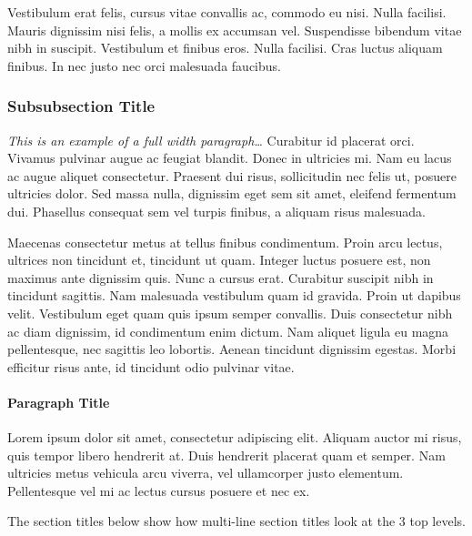 \documentclass[
	a4paper, %
	12pt, %
]{include/CSSullivanBusinessReport}
\begin{document}
\nonumsidenote{
	}Vestibulum erat felis, cursus vitae convallis ac, commodo eu nisi. Nulla facilisi. Mauris dignissim nisi felis, a mollis ex accumsan vel. Suspendisse bibendum vitae nibh in suscipit. Vestibulum et finibus eros. Nulla facilisi. Cras luctus aliquam finibus. In nec justo nec orci malesuada faucibus.

\subsubsection{Subsubsection Title} %

\begin{fullwidth} %
	\textit{This is an example of a full width paragraph\ldots} Curabitur id placerat orci. Vivamus pulvinar augue ac feugiat blandit. Donec in ultricies mi. Nam eu lacus ac augue aliquet consectetur. Praesent dui risus, sollicitudin nec felis ut, posuere ultricies dolor. Sed massa nulla, dignissim eget sem sit amet, eleifend fermentum dui. Phasellus consequat sem vel turpis finibus, a aliquam risus malesuada.
\end{fullwidth}

Maecenas consectetur metus at tellus finibus condimentum. Proin arcu lectus, ultrices non tincidunt et, tincidunt ut quam. Integer luctus posuere est, non maximus ante dignissim quis. Nunc a cursus erat. Curabitur suscipit nibh in tincidunt sagittis. Nam malesuada vestibulum quam id gravida. Proin ut dapibus velit. Vestibulum eget quam quis ipsum semper convallis. Duis consectetur nibh ac diam dignissim, id condimentum enim dictum. Nam aliquet ligula eu magna pellentesque, nec sagittis leo lobortis. Aenean tincidunt dignissim egestas. Morbi efficitur risus ante, id tincidunt odio pulvinar vitae.

\paragraph{Paragraph Title} %

Lorem ipsum dolor sit amet, consectetur adipiscing elit. Aliquam auctor mi risus, quis tempor libero hendrerit at. Duis hendrerit placerat quam et semper. Nam ultricies metus vehicula arcu viverra, vel ullamcorper justo elementum. Pellentesque vel mi ac lectus cursus posuere et nec ex.

The section titles below show how multi-line section titles look at the 3 top levels.


\end{document}
